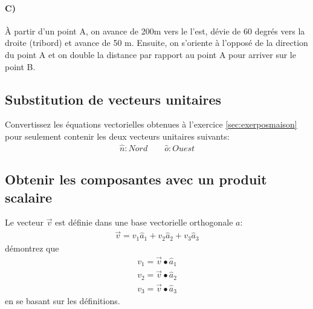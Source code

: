 \paragraph{C)} 

À partir d'un point A, on avance de 200m vers le l'est, dévie de 60 degrés vers la droite (tribord) et avance de 50 m. Ensuite, on s'oriente à l'opposé de la direction du point A et on double la distance par rapport au point A pour arriver sur le point B.
 

\subsection{Substitution de vecteurs unitaires}

Convertissez les équations vectorielles obtenues à l’exercice \ref{sec:exerposmaison} pour seulement contenir les deux vecteurs unitaires suivants:
\begin{align}
\hat{n} : Nord \quad\quad   \hat{o} : Ouest
\end{align} 



\subsection{Obtenir les composantes avec un produit scalaire}

Le vecteur $\vec{v}$ est définie dans une base vectorielle orthogonale $a$:
\begin{align}
\vec{v} = v_1 \hat{a}_1 + v_2 \hat{a}_2 + v_3 \hat{a}_3
\end{align} 
démontrez que 
\begin{align}
v_1 = \vec{v} \bullet \hat{a}_1 \\
v_2 = \vec{v} \bullet \hat{a}_2 \\
v_3 = \vec{v} \bullet \hat{a}_3 
\end{align} 
en se basant sur les définitions.



